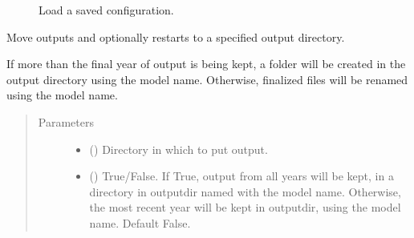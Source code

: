 \documentclass[letterpaper,10pt,english]{sphinxmanual}
\begin{document}
\begin{fulllineitems}
\begin{fulllineitems}
\begin{quote}
\begin{description}
\end{description}\end{quote}



\begin{description}
\item[{{\hyperref[\detokenize{source/exoplasim:exoplasim.Model.loadconfig}]{}}}] \leavevmode
Load a saved configuration.

\end{description}



\end{fulllineitems}


\begin{fulllineitems}
\label{\detokenize{source/exoplasim:exoplasim.Model.finalize}}
Move outputs and optionally restarts to a specified output directory.

If more than the final year of output is being kept, a folder will be created in the output directory using the model name. Otherwise, finalized files will be renamed using the model name.
\begin{quote}\begin{description}
\item[{Parameters}] \leavevmode\begin{itemize}
\item {} 
 () \textendash{} Directory in which to put output.

\item {} 
 (\sphinxstyleliteralemphasis{\sphinxupquote{, }}) \textendash{} True/False. If True, output from all years will be kept, in a directory in
outputdir named with the model name. Otherwise, the most recent year will be
kept in outputdir, using the model name. Default False.


\end{itemize}
\end{description}
\end{quote}
\end{fulllineitems}
\end{fulllineitems}
\end{document}

